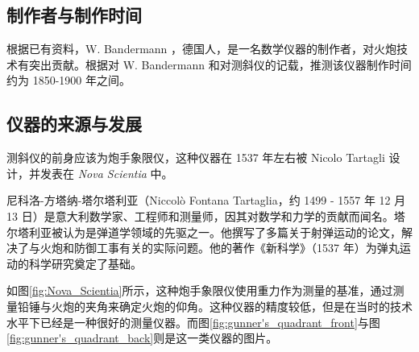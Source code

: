 \documentclass[UTF8]{ctexart}
\begin{document}
\subsection{制作者与制作时间}

根据已有资料，W. Bandermann ，德国人，是一名数学仪器的制作者\cite{W-Bandermann}，对火炮技术有突出贡献。根据对 W. Bandermann 和对测斜仪的记载，推测该仪器制作时间约为 1850-1900 年之间。

\subsection{仪器的来源与发展}

测斜仪的前身应该为炮手象限仪，这种仪器在 1537 年左右被 Nicolo Tartagli 设计，并发表在 \emph{Nova Scientia} 中\cite{doi:10.1080/00033799100200321}\cite{stanley1994quadrant}。

尼科洛-方塔纳-塔尔塔利亚（Niccolò Fontana Tartaglia，约 1499 - 1557 年 12 月 13 日）是意大利数学家、工程师和测量师，因其对数学和力学的贡献而闻名。塔尔塔利亚被认为是弹道学领域的先驱之一。他撰写了多篇关于射弹运动的论文，解决了与火炮和防御工事有关的实际问题。他的著作《新科学》（1537 年）为弹丸运动的科学研究奠定了基础。

如图\ref{fig:Nova_Scientia}所示，这种炮手象限仪使用重力作为测量的基准，通过测量铅锤与火炮的夹角来确定火炮的仰角。这种仪器的精度较低，但是在当时的技术水平下已经是一种很好的测量仪器。而图\ref{fig:gunner's_quadrant_front}与图\ref{fig:gunner's_quadrant_back}则是这一类仪器的图片。
\end{document}
